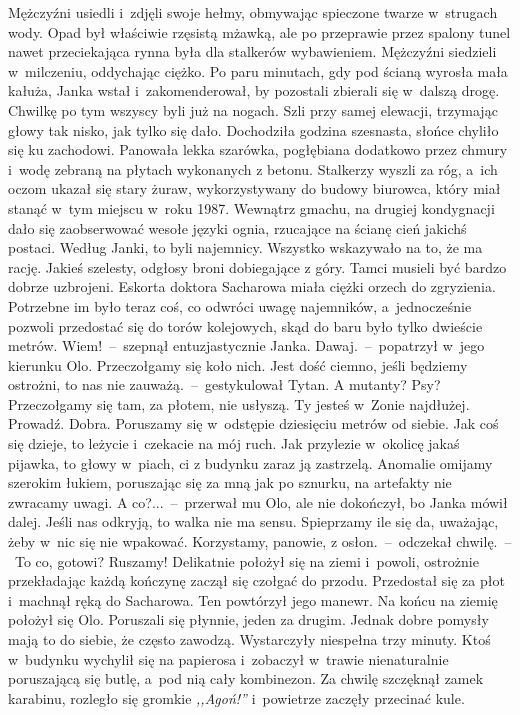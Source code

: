 \documentclass[../MAIN.tex]{subfiles}
\begin{document}
Mężczyźni usiedli i~zdjęli swoje hełmy, obmywając spieczone twarze w~strugach wody. Opad był właściwie rzęsistą mżawką, ale po przeprawie przez spalony tunel nawet przeciekająca rynna była dla stalkerów wybawieniem.
\pp
Mężczyźni siedzieli w~milczeniu, oddychając ciężko. Po paru minutach, gdy pod ścianą wyrosła mała kałuża, Janka wstał i~zakomenderował, by pozostali zbierali się w~dalszą drogę. Chwilkę po tym wszyscy byli już na nogach. Szli przy samej elewacji, trzymając głowy tak nisko, jak tylko się dało. Dochodziła godzina szesnasta, słońce chyliło się ku zachodowi. Panowała lekka szarówka, pogłębiana dodatkowo przez chmury i~wodę zebraną na płytach wykonanych z betonu.
\pp
Stalkerzy wyszli za róg, a~ich oczom ukazał się stary żuraw, wykorzystywany do budowy biurowca, który miał stanąć w~tym miejscu w~roku 1987. Wewnątrz gmachu, na drugiej kondygnacji dało się zaobserwować wesołe języki ognia, rzucające na ścianę cień jakichś postaci. Według Janki, to byli najemnicy. Wszystko wskazywało na to, że ma rację. Jakieś szelesty, odgłosy broni dobiegające z góry. Tamci musieli być bardzo dobrze uzbrojeni. Eskorta doktora Sacharowa miała ciężki orzech do zgryzienia. Potrzebne im było teraz coś, co odwróci uwagę najemników, a~jednocześnie pozwoli przedostać się do torów kolejowych, skąd do baru było tylko dwieście metrów.
\sx Wiem!~--~szepnął entuzjastycznie Janka.
\xx Dawaj.~--~popatrzył w~jego kierunku Olo.
\xx Przeczołgamy się koło nich. Jest dość ciemno, jeśli będziemy ostrożni, to nas nie zauważą.~--~gestykulował Tytan.
\xx A mutanty?
\xx Psy? Przeczołgamy się tam, za płotem, nie usłyszą.
\xx Ty jesteś w~Zonie najdłużej. Prowadź.
\xx Dobra. Poruszamy się w~odstępie dziesięciu metrów od siebie. Jak coś się dzieje, to leżycie i~czekacie na mój ruch. Jak przylezie w~okolicę jakaś pijawka, to głowy w~piach, ci z budynku zaraz ją zastrzelą. Anomalie omijamy szerokim łukiem, poruszając się za mną jak po sznurku, na artefakty nie zwracamy uwagi.
\xx A co?...~--~przerwał mu Olo, ale nie dokończył, bo Janka mówił dalej.
\xx Jeśli nas odkryją, to walka nie ma sensu. Spieprzamy ile się da, uważając, żeby w~nic się nie wpakować. Korzystamy, panowie, z osłon.~--~odczekał chwilę.~--~To co, gotowi? Ruszamy!
\qd \mm Delikatnie położył się na ziemi i~powoli, ostrożnie przekładając każdą kończynę zaczął się czołgać do przodu. Przedostał się za płot i~machnął ręką do Sacharowa. Ten powtórzył jego manewr. Na końcu na ziemię położył się Olo. Poruszali się płynnie, jeden za drugim. Jednak dobre pomysły mają to do siebie, że często zawodzą. Wystarczyły niespełna trzy minuty. Ktoś w~budynku wychylił się na papierosa i~zobaczył w~trawie nienaturalnie poruszającą się butlę, a~pod nią cały kombinezon. Za chwilę szczęknął zamek karabinu, rozległo się gromkie \textit{,,Agoń!'' }i~powietrze zaczęły przecinać kule.
\end{document}
